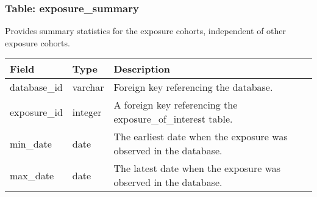 \documentclass[
]{article}
\begin{document}
\hypertarget{table-exposure_summary}{%
\subsubsection{Table: exposure\_summary}\label{table-exposure_summary}}

Provides summary statistics for the exposure cohorts, independent of
other exposure cohorts.

\begin{longtable}[]{@{}lll@{}}
\toprule
\begin{minipage}[b]{0.23\columnwidth}\raggedright
Field\strut
\end{minipage} & \begin{minipage}[b]{0.18\columnwidth}\raggedright
Type\strut
\end{minipage} & \begin{minipage}[b]{0.50\columnwidth}\raggedright
Description\strut
\end{minipage}\tabularnewline
\midrule
\endhead
\begin{minipage}[t]{0.23\columnwidth}\raggedright
database\_id\strut
\end{minipage} & \begin{minipage}[t]{0.18\columnwidth}\raggedright
varchar\strut
\end{minipage} & \begin{minipage}[t]{0.50\columnwidth}\raggedright
Foreign key referencing the database.\strut
\end{minipage}\tabularnewline
\begin{minipage}[t]{0.23\columnwidth}\raggedright
exposure\_id\strut
\end{minipage} & \begin{minipage}[t]{0.18\columnwidth}\raggedright
integer\strut
\end{minipage} & \begin{minipage}[t]{0.50\columnwidth}\raggedright
A foreign key referencing the exposure\_of\_interest table.\strut
\end{minipage}\tabularnewline
\begin{minipage}[t]{0.23\columnwidth}\raggedright
min\_date\strut
\end{minipage} & \begin{minipage}[t]{0.18\columnwidth}\raggedright
date\strut
\end{minipage} & \begin{minipage}[t]{0.50\columnwidth}\raggedright
The earliest date when the exposure was observed in the database.\strut
\end{minipage}\tabularnewline
\begin{minipage}[t]{0.23\columnwidth}\raggedright
max\_date\strut
\end{minipage} & \begin{minipage}[t]{0.18\columnwidth}\raggedright
date\strut
\end{minipage} & \begin{minipage}[t]{0.50\columnwidth}\raggedright
The latest date when the exposure was observed in the database.\strut
\end{minipage}\tabularnewline
\bottomrule
\end{longtable}
\end{document}
